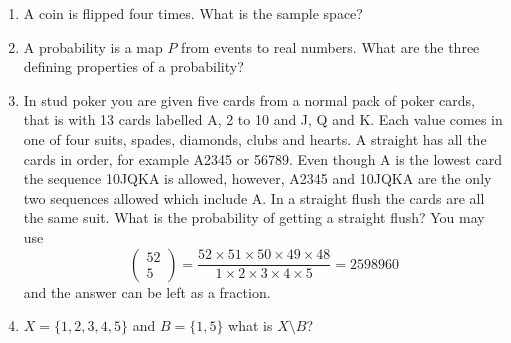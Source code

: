\documentclass{article}
\newif\ifanswer
\begin{document}
\begin{enumerate}

\item A coin is flipped four times. What is the sample space?

  \ifanswer
  Solution: 
  $\{TTTT,TTTH,TTHT,TTHH,THTT,THTH,THHT,$\\$THHH,HTTT,HTTH,HTHT,HTHH,HHTT,HHTH,HHHT,$\\$HHHH\}$.
  \fi


\item A probability is a map $P$ from events to real numbers. What are the three defining properties of a probability?

  \ifanswer
    Solution: 
\begin{enumerate}
\item $P(A)\ge 0$ for all events.
\item $P(X)=1$
\item If $A\cap B=\emptyset$ for two events $A$ and $B$ then 
\begin{equation}
P(A\cup B)=P(A)+P(B)
\end{equation}
\end{enumerate}
where $A\cap B$ and $A\cup B$ are the intersection and union of $A$
and $B$ and $\emptyset$ is the empty set.
\fi
  
\item In stud poker you are given five cards from a normal pack of
  poker cards, that is with 13 cards labelled A, 2 to 10 and J, Q and
  K. Each value comes in one of four suits, spades, diamonds, clubs
  and hearts.  A straight has all the cards in order, for example
  A2345 or 56789. Even though A is the lowest card the sequence 10JQKA
  is allowed, however, A2345 and 10JQKA are the only two sequences
  allowed which include A. In a straight flush the cards are all the
  same suit. What is the probability of getting a straight flush? You may use
 $$
\left(\begin{array}{c}52\\5\end{array}\right)=\frac{52\times 51\times 50\times 49\times 48}{1\times 2 \times 3 \times 4\times 5}=2598960
  $$
  and the answer can be left as a fraction.

  \ifanswer
    Solution: 
    $$P=40/2598960=1/64974$$
    or if you exclude the royal flushes
    $$P=36/2598960$$
    either answer is acceptable.
  \fi

\item $X=\{1,2,3,4,5\}$ and $B=\{1,5\}$ what is $X\setminus B$?


\end{enumerate}
\end{document}
